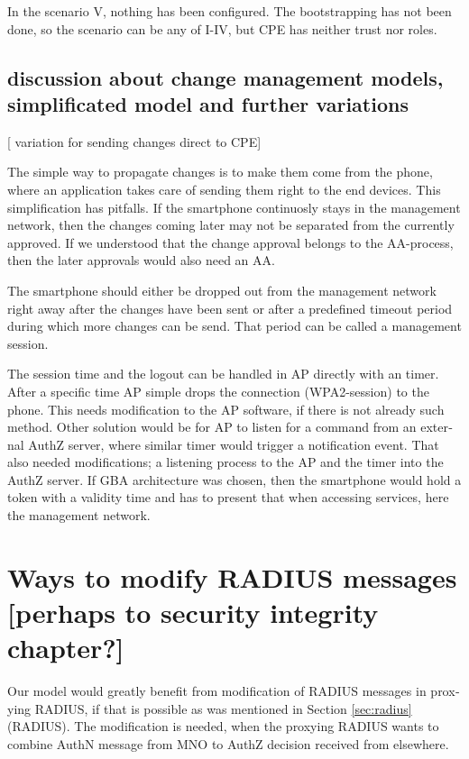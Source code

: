 \documentclass[12pt,a4paper,english]{tutthesis}
\begin{document}
\begin{otherlanguage}{english}
In the scenario V, nothing has been configured. The bootstrapping
has not been done, so the scenario can be any of I-IV, but CPE has neither trust nor roles.



\subsection{discussion about change management models, simplificated model and further variations}
\label{sec-4-6-1}
[ variation for sending changes direct to CPE]

The simple way to propagate changes is to make them come from the phone,
where an application takes care of sending them right to the end
devices. This simplification has pitfalls. If the smartphone continuosly stays
in the management network, then the changes coming later may not be 
separated from the currently approved.
If we understood that the change approval belongs to the AA-process, then
the later approvals would also need an AA.

 The smartphone should either be dropped out from the management
network right away after the changes have been sent or after a
predefined timeout period during which more changes can be send.
That period can be called a management session.

The session time and the logout can be handled in AP directly with
an timer. After a specific time AP simple drops the connection
(WPA2-session) to the phone. This needs modification to the AP
software, if there is not already such method.
Other solution would be for AP to listen for a command from an external
AuthZ server, where similar timer would trigger a notification event. 
That also needed modifications;  a listening process to the AP and 
the timer into the AuthZ server. 
If GBA architecture was chosen, then the smartphone would hold a 
token with a validity time and has to present that when accessing
services, here the management network. 

\section{Ways to modify RADIUS messages [perhaps to security integrity chapter?]}
\label{sec-4-7}
\label{sec:radius-macs}

Our model would greatly benefit from modification of RADIUS messages in proxying
RADIUS, if that is possible as was mentioned in Section \ref{sec:radius}(RADIUS).
The modification is needed, when the proxying RADIUS wants to combine AuthN message
from MNO to AuthZ decision received from elsewhere.





\end{otherlanguage}
\end{document}
